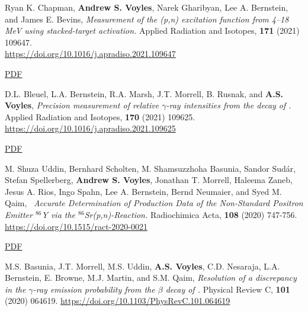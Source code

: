 \begin{bibsection}
\item Ryan K. Chapman, \textbf{Andrew S. Voyles}, Narek Gharibyan, Lee A. Bernstein, and
James E. Bevins, \emph{Measurement of the (p,n) excitation function from 4--18 MeV using stacked-target activation.} Applied Radiation and Isotopes, \textbf{171} (2021) 109647. \\ \url{https://doi.org/10.1016/j.apradiso.2021.109647} 

\ifshort \vspace{0.1cm} \href{https://avoyles.github.io/papers/Chapman2021_160Tb.pdf}{\underline{PDF}} \else  \fi 


\item D.L. Bleuel, L.A. Bernstein, R.A. Marsh, J.T. Morrell, B. Rusnak, and \textbf{A.S. Voyles},  \emph{Precision measurement of relative $\gamma$-ray intensities from the decay of .} Applied Radiation and Isotopes, \textbf{170} (2021) 109625. \url{https://doi.org/10.1016/j.apradiso.2021.109625} 

\ifshort \vspace{0.1cm} \href{https://avoyles.github.io/papers/Bleuel2021_61Cu.pdf}{\underline{PDF}} \else  \fi 


\item M. Shuza Uddin, Bernhard Scholten, M. Shamsuzzhoha Basunia, Sandor Sudár, Stefan Spellerberg, \textbf{Andrew S. Voyles}, Jonathan T. Morrell, Haleema Zaneb, Jesus A. Rios, Ingo Spahn, Lee A. Bernstein, Bernd Neumaier, and Syed M. Qaim, \ \emph{Accurate Determination of Production Data of the Non-Standard Positron Emitter $^{86}$Y via the $^{86}$Sr(p,n)-Reaction.} Radiochimica Acta, \textbf{108} (2020) 747-756. \url{https://doi.org/10.1515/ract-2020-0021} 

\ifshort \vspace{0.1cm} \href{https://avoyles.github.io/papers/Uddin2020_86Y.pdf}{\underline{PDF}} \else  \fi 

\item M.S. Basunia, J.T. Morrell, M.S. Uddin, \textbf{A.S. Voyles}, C.D. Nesaraja, L.A. Bernstein, E. Browne, M.J. Martin, and S.M. Qaim, \emph{Resolution of a discrepancy in the $\gamma$-ray emission probability from the $\beta$ decay of .} Physical Review C, \textbf{101} (2020) 064619. \url{https://doi.org/10.1103/PhysRevC.101.064619} 


\end{bibsection}
